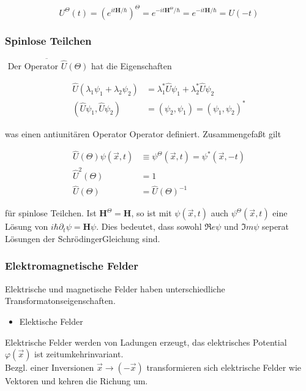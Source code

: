 \documentclass[10pt, letterpaper]{article}
\begin{document}
$$
U^{\Theta}(t)=\left(e^{i t \mathbf{H} / \hbar}\right)^{\Theta}=e^{-i t \mathbf{H}^{\Theta} / \hbar}=e^{-i t \mathbf{H} / \hbar}=U(-t)
$$

\subsubsection*{Spinlose Teilchen}
$\overline{\text { Der Operator } \hat{U}(\Theta)}$ hat die Eigenschaften

$$
\begin{aligned}
\widehat{U}\left(\lambda_{1} \psi_{1}+\lambda_{2} \psi_{2}\right) & =\lambda_{1}^{*} \widehat{U} \psi_{1}+\lambda_{2}^{*} \widehat{U} \psi_{2} \\
\left(\widehat{U} \psi_{1}, \widehat{U} \psi_{2}\right) & =\left(\psi_{2}, \psi_{1}\right)=\left(\psi_{1}, \psi_{2}\right)^{*}
\end{aligned}
$$

was einen antiunitären Operator Operator definiert. Zusammengefaßt gilt

$$
\begin{aligned}
\widehat{U}(\Theta) \psi(\vec{x}, t) & \equiv \psi^{\Theta}(\vec{x}, t)=\psi^{*}(\vec{x},-t) \\
\widehat{U}^{2}(\Theta) & =1 \\
\widehat{U}(\Theta) & =\widehat{U}(\Theta)^{-1}
\end{aligned}
$$

für spinlose Teilchen. Ist $\mathbf{H}^{\Theta}=\mathbf{H}$, so ist mit $\psi(\vec{x}, t)$ auch $\psi^{\Theta}(\vec{x}, t)$ eine Lösung von $i \hbar \partial_{t} \psi=\mathbf{H} \psi$. Dies bedeutet, dass sowohl $\Re e \psi$ und $\Im m \psi$ seperat Lösungen der SchrödingerGleichung sind.

\subsubsection*{Elektromagnetische Felder}
Elektrische und magnetische Felder haben unterschiedliche Transformatonseigenschaften.

\begin{itemize}
  \item Elektische Felder
\end{itemize}

Elektrische Felder werden von Ladungen erzeugt, das elektrisches Potential $\varphi(\vec{x})$ ist zeitumkehrinvariant.\\
Bezgl. einer Inversionen $\vec{x} \rightarrow(-\vec{x})$ transformieren sich elektrische Felder wie Vektoren und kehren die Richung um.
\end{document}

